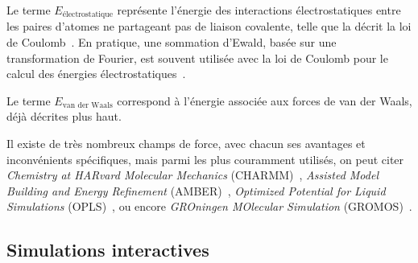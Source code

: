 	Le terme $E_\text{électrostatique}$ représente l'énergie des interactions électrostatiques entre les paires d'atomes ne partageant pas de liaison covalente, telle que la décrit la loi de Coulomb~\cite{coulomb1785premier}.%
	En pratique, une sommation d'Ewald, basée sur une transformation de Fourier, est souvent utilisée avec la loi de Coulomb pour le calcul des énergies électrostatiques~\cite{ewald1921berechnung, essmann1995smooth}.
	
	Le terme $E_\text{van der Waals}$ correspond à l'énergie associée aux forces de van der Waals, déjà décrites plus haut.%
	
%	
%	
	
	Il existe de très nombreux champs de force, avec chacun ses avantages et inconvénients spécifiques, mais parmi les plus couramment utilisés, on peut citer \emph{Chemistry at HARvard Molecular Mechanics} (CHARMM)~\cite{brooks1983charmm, brooks2009charmm}, \emph{Assisted Model Building and Energy Refinement} (AMBER)~\cite{cornell1995second, wang2004development}, \emph{Optimized Potential for Liquid Simulations} (OPLS)~\cite{jorgensen1996development, kaminski2001evaluation}, ou encore \emph{GROningen MOlecular Simulation} (GROMOS)~\cite{scott1999gromos, oostenbrink2004biomolecular}.
	
    
	\subsection{Simulations interactives}
